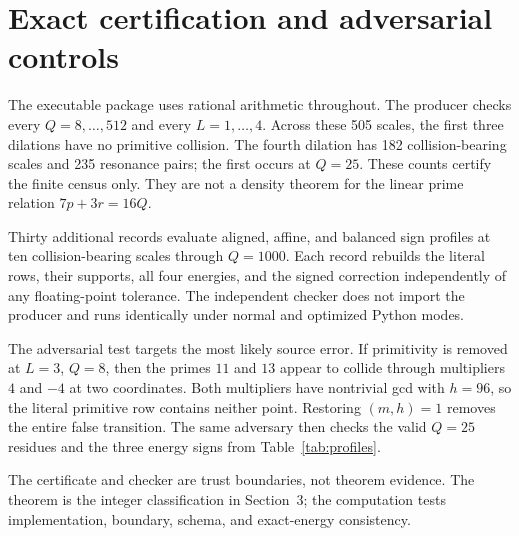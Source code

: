\section{Exact certification and adversarial controls}

The executable package uses rational arithmetic throughout.  The producer checks every
$Q=8,\ldots,512$ and every $L=1,\ldots,4$.  Across these 505 scales, the first
three dilations have no primitive collision.  The fourth dilation has 182
collision-bearing scales and 235 resonance pairs; the first occurs at $Q=25$.
These counts certify the finite census only.  They are not a density theorem for the
linear prime relation $7p+3r=16Q$.

Thirty additional records evaluate aligned, affine, and balanced sign profiles at ten
collision-bearing scales through $Q=1000$.  Each record rebuilds the literal rows,
their supports, all four energies, and the signed correction independently of any
floating-point tolerance.  The independent checker does not import the producer and
runs identically under normal and optimized Python modes.

The adversarial test targets the most likely source error.  If primitivity is removed at
$L=3$, $Q=8$, then the primes $11$ and $13$ appear to collide through multipliers
$4$ and $-4$ at two coordinates.  Both multipliers have nontrivial gcd with $h=96$,
so the literal primitive row contains neither point.  Restoring $(m,h)=1$ removes the
entire false transition.  The same adversary then checks the valid $Q=25$ residues and
the three energy signs from Table~\ref{tab:profiles}.

The certificate and checker are trust boundaries, not theorem evidence.  The theorem is
the integer classification in Section~3; the computation tests implementation,
boundary, schema, and exact-energy consistency.
